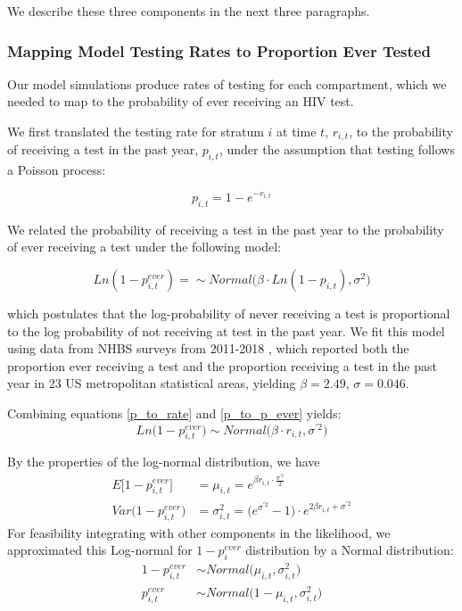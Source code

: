 \documentclass{article}
\begin{document}
We describe these three components in the next three paragraphs.

\subsubsection{Mapping Model Testing Rates to Proportion Ever Tested} \label{mapping_testing}

Our model simulations produce rates of testing for each compartment, which we needed to map to the probability of ever receiving an HIV test.

We first translated the testing rate for stratum $i$ at time $t$, $r_{i,t}$, to the probability of receiving a test in the past year, $p_{i,t}$, under the assumption that testing follows a Poisson process:

\begin{equation} \label{p_to_rate}
	p_{i,t} = 1 - e^{-r_{i,t}}
\end{equation}


We related the probability of receiving a test in the past year to the probability of ever receiving a test under the following model:

\begin{equation} \label{p_to_p_ever}
	Ln(1-p^{ever}_{i,t}) = \sim Normal\big(\beta \cdot Ln(1-p_{i,t}), \sigma^2\big)
\end{equation}

which postulates that the log-probability of never receiving a test is proportional to the log probability of not receiving at test in the past year. We fit this model using data from NHBS surveys from 2011-2018 \cite{nhbs8,nhbs11,nhbs13,nhbs15,nhbs18,nhbs19,nhbs22,nhbs24}, which reported both the proportion ever receiving a test and the proportion receiving a test in the past year in 23 US metropolitan statistical areas, yielding $\beta = 2.49$, $\sigma=0.046$.

Combining equations \ref{p_to_rate} and \ref{p_to_p_ever} yields:
\begin{equation}
	Ln\big(1 - p^{ever}_{i,t}\big) \sim Normal\big(\beta \cdot r_{i,t}, \sigma^{\prime 2}\big)
\end{equation}

By the properties of the log-normal distribution, we have 
\begin{align} \label{mapping_testing_mu}
	E\big[1-p^{ever}_{i,t}\big] &= \mu_{i,t} = e^{\beta r_{i,t} \cdot \frac{\sigma^{\prime  2}}{2}} \\
	Var\big(1-p^{ever}_{i,t}\big) &= \sigma^2_{i,t} = \big(e^{\sigma^{\prime 2}} - 1) \cdot e^{2 \beta r_{i,t} + \sigma^{\prime 2}}
\end{align}
For feasibility integrating with other components in the likelihood, we approximated this Log-normal for $1-p^{ever}_i$ distribution by a Normal distribution:
\begin{align}
	1 - p^{ever}_{i,t} &\sim Normal\big(\mu_{i,t}, \sigma^2_{i,t}\big) \\
	p^{ever}_{i,t} &\sim Normal\big(1-\mu_{i,t}, \sigma^2_{i,t}\big)
\end{align}
\end{document}
